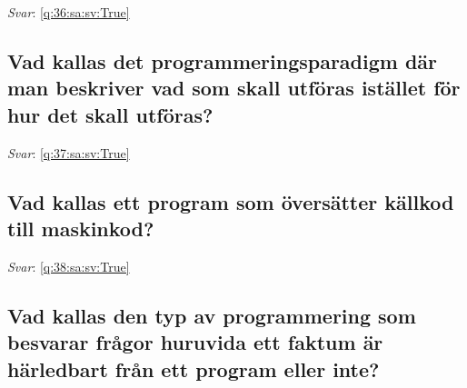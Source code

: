\documentclass[a4paper,11pt,oneside]{article}
\begin{document}
\begin{sloppypar}
\label{q:36:sa:sv:False}

\vspace{2cm}

\noindent\makebox[\textwidth]{\hrulefill}

\vspace{1cm}

\textit{Svar}: \autoref{q:36:sa:sv:True}



\subsection{Vad kallas det programmeringsparadigm d\"ar man beskriver vad som skall utf\"oras ist\"allet f\"or hur det skall utf\"oras?}

\label{q:37:sa:sv:False}

\vspace{2cm}

\noindent\makebox[\textwidth]{\hrulefill}

\vspace{1cm}

\textit{Svar}: \autoref{q:37:sa:sv:True}



\subsection{Vad kallas ett program som \"overs\"atter k\"allkod till maskinkod?}

\label{q:38:sa:sv:False}

\vspace{2cm}

\noindent\makebox[\textwidth]{\hrulefill}

\vspace{1cm}

\textit{Svar}: \autoref{q:38:sa:sv:True}



\subsection{Vad kallas den typ av programmering som besvarar fr\r{a}gor huruvida ett faktum \"ar h\"arledbart fr\r{a}n ett program eller inte?}

\label{q:39:sa:sv:False}

\vspace{2cm}

\noindent\makebox[\textwidth]{\hrulefill}

\vspace{1cm}


\end{sloppypar}
\end{document}

